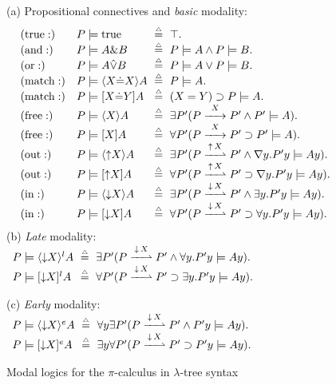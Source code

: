 \documentclass{acmtrans2m}
\def \mTrue {\hbox{true}}
\def \mAnd {\&}
\def \mOr {\hat \lor}
\newcommand \stf[2] {#1 \models #2}
\newcommand \matchBox[3] {[#1 \dot = #2] #3}
\newcommand \matchDia[3] {\langle #1 \dot = #2\rangle #3}
\newcommand \actBox[2] {[#1] #2}
\newcommand \actDia[2] {\langle #1 \rangle #2}
\newcommand \outBox[2] {[\outact\! #1] #2}
\newcommand \outDia[2] {\langle \outact\! #1 \rangle #2}
\newcommand \inBox[2] {[\inact\! #1] #2}
\newcommand \inDia[2] {\langle \inact\! #1 \rangle #2}
\newcommand \inBoxL[2] {[\inact\! #1]^l #2}
\newcommand \inDiaL[2] {\langle \inact\! #1 \rangle^l #2}
\newcommand \inBoxE[2] {[\inact\! #1]^e #2}
\newcommand \inDiaE[2] {\langle \inact\! #1\rangle^e #2}
\newcommand{\defeq}{\mathrel{\stackrel{{\scriptscriptstyle\triangle}}{=}}}
\newcommand{\inact}{\mathop{\downarrow}}
\newcommand{\oimp}{\supset}
\newcommand{\one  }[3]{#1\stackrel{#2}{-\!\!-\!\!\!\rightarrow    } #3}
\newcommand{\onep }[3]{#1\stackrel{#2}{-\!\!-\!\!\!\rightharpoonup} #3}
\newcommand{\outact}{\mathop{\uparrow}}
\begin{document}
\begin{figure}[t]
(a) Propositional connectives and {\em basic} modality:
$$
\begin{array}{ll@{\ \null\defeq\null\ }l}
(\mTrue:) & \stf P \mTrue  & \top. \\
(\hbox{and}:) & \stf P {A \mAnd B}  &  \stf P A \land \stf P B.\\
(\hbox{or}:) & \stf P {A \mOr B}  &  \stf P A \lor \stf P B.\\
(\hbox{match}:)&\stf P {\matchDia X X A} & \stf P A. \\
(\hbox{match}:)&\stf P {\matchBox X Y A} & (X = Y) \oimp \stf P A.\\
(\hbox{free}:) &\stf P {\actDia{X} A}&\exists P'(\one{P}{X}{P'}\land \stf{P'}{A}).\\
(\hbox{free}:) &\stf P {\actBox{X} A}&\forall P'(\one{P}{X}{P'}\oimp \stf{P'}{A}).\\
(\hbox{out}:)  &\stf P {\outDia X A} &\exists P'(\onep{P}{\outact X}{P'} \land 
                                      \nabla y.\stf {P'y} {A y}).\\
(\hbox{out}:) & \stf P {\outBox X A}  &  
       \forall P'(\onep{P}{\outact X}{P'} \oimp \nabla y.\stf {P' y}{A y}).\\
(\hbox{in}:) & \stf P {\inDia X A}  &  \exists P'(\onep{P}{\inact X}{P'} \land 
                 \exists y.\stf {P'y} {A y}).\\
(\hbox{in}:) & \stf P {\inBox X A} & \forall P'(\onep{P}{\inact X}{P'} \oimp 
                       \forall y. \stf {P' y}{A y}).
\end{array}
$$
(b) {\em Late} modality:
$
\begin{array}{l@{\ \null\defeq\null\ }l}
\stf P {\inDiaL X A} & \exists P'(\onep{P}{\inact X}{P'} \land \forall y. \stf {P'y} {A y}).\\
\stf P {\inBoxL X A} & \forall P'(\onep{P}{\inact X}{P'} \oimp \exists y.\stf {P' y}{A y}).
\end{array}
$

\vskip11pt
(c) {\em Early} modality:
$
\begin{array}{l@{\ \null\defeq\null\ }l}
\stf P {\inDiaE X A} & \forall y\exists P'(\onep{P}{\inact X}{P'} \land \stf {P'y} {A y}).\\
\stf P {\inBoxE X A} & \exists y\forall P'(\onep{P}{\inact X}{P'} \oimp \stf {P' y}{A y}).
\end{array}
$
\caption{Modal logics for the $\pi$-calculus in $\lambda$-tree syntax}
\label{fig:modal}
\end{figure}
\end{document}

